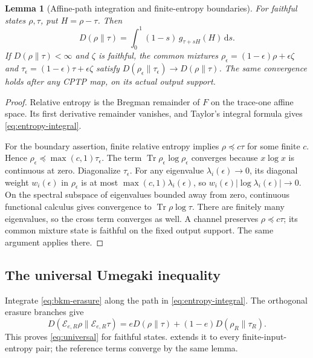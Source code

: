\documentclass[11pt]{article}
\numberwithin{equation}{section}
\newtheorem{lemma}[theorem]{Lemma}
\theoremstyle{definition}
\theoremstyle{remark}
\DeclareMathOperator{\Tr}{Tr}
\newcommand{\E}{\mathcal E}
\newcommand{\dd}{\,\mathrm d}
\begin{document}
\begin{lemma}[Affine-path integration and finite-entropy boundaries]
\label{lem:entropy-integration}
For faithful states $\rho,\tau$, put $H=\rho-\tau$. Then
\begin{equation}
 D(\rho\|\tau)=\int_0^1(1-s)\,g_{\tau+sH}(H)\dd s.
 \label{eq:entropy-integral}
\end{equation}
If $D(\rho\|\tau)<\infty$ and $\zeta$ is faithful, the common mixtures
$\rho_\epsilon=(1-\epsilon)\rho+\epsilon\zeta$ and
$\tau_\epsilon=(1-\epsilon)\tau+\epsilon\zeta$ satisfy
$D(\rho_\epsilon\|\tau_\epsilon)\to D(\rho\|\tau)$.
The same convergence holds after any CPTP map, on its actual output support.
\end{lemma}
\begin{proof}
Relative entropy is the Bregman remainder of $F$ on the trace-one affine
space. Its first derivative remainder vanishes, and Taylor's integral
formula gives \eqref{eq:entropy-integral}.

For the boundary assertion, finite relative entropy implies
$\rho\preceq c\tau$ for some finite $c$. Hence
$\rho_\epsilon\preceq\max(c,1)\tau_\epsilon$.
The term $\Tr\rho_\epsilon\log\rho_\epsilon$ converges because
$x\log x$ is continuous at zero. Diagonalize $\tau_\epsilon$.
For any eigenvalue $\lambda_i(\epsilon)\to0$, its diagonal weight
$w_i(\epsilon)$ in $\rho_\epsilon$ is at most
$\max(c,1)\lambda_i(\epsilon)$, so
$w_i(\epsilon)|\log\lambda_i(\epsilon)|\to0$.
On the spectral subspace of eigenvalues bounded away from zero,
continuous functional calculus gives convergence to $\Tr\rho\log\tau$.
There are finitely many eigenvalues, so the cross term converges as well.
A channel preserves $\rho\preceq c\tau$; its common mixture state is
faithful on the fixed output support. The same argument applies there.
\end{proof}

\subsection{The universal Umegaki inequality}

Integrate \eqref{eq:bkm-erasure} along the path in
\eqref{eq:entropy-integral}. The orthogonal erasure branches give
\[
 D(\E_{e,R}\rho\|\E_{e,R}\tau)
 =eD(\rho\|\tau)+(1-e)D(\rho_R\|\tau_R).
\]
This proves \eqref{eq:universal} for faithful states.
 extends it to every finite-input-entropy pair;
the reference terms converge by the same lemma.
\end{document}
